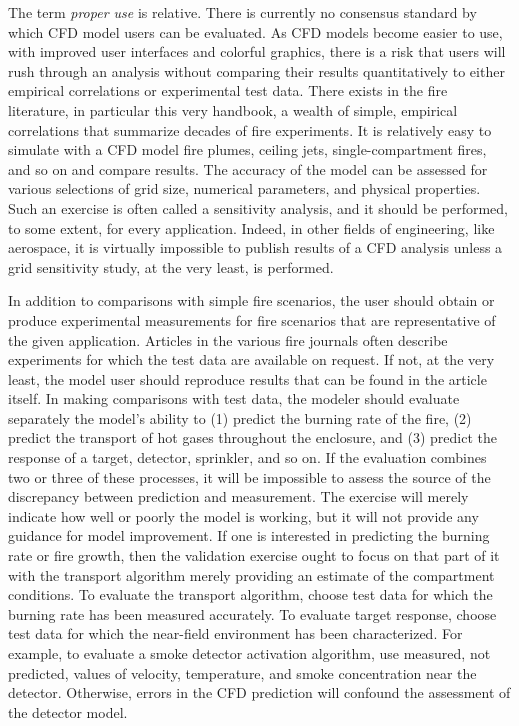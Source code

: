 \documentclass[graybox]{svmult}
\begin{document}
The term {\em proper use} is relative. There is currently no consensus standard by which CFD model users can be evaluated. As CFD models become easier to use, with improved user interfaces and colorful graphics, there is a risk that users will rush through an analysis without comparing their results quantitatively to either empirical correlations or experimental test data. There exists in the fire literature, in particular this very handbook, a wealth of simple, empirical correlations that summarize decades of fire experiments. It is relatively easy to simulate with a CFD model fire plumes, ceiling jets, single-compartment fires, and so on and compare results. The accuracy of the model can be assessed for various selections of grid size, numerical parameters, and physical properties. Such an exercise is often called a sensitivity analysis, and it should be performed, to some extent, for every application. Indeed, in other fields of engineering, like aerospace, it is virtually impossible to publish results of a CFD analysis unless a grid sensitivity study, at the very least, is performed.

In addition to comparisons with simple fire scenarios, the user should obtain or produce experimental measurements for fire scenarios that are representative of the given application. Articles in the various fire journals often describe experiments for which the test data are available on request. If not, at the very least, the model user should reproduce results that can be found in the article itself. In making comparisons with test data, the modeler should evaluate separately the model's ability to (1) predict the burning rate of the fire, (2) predict the transport of hot gases throughout the enclosure, and (3) predict the response of a target, detector, sprinkler, and so on. If the evaluation combines two or three of these processes, it will be impossible to assess the source of the discrepancy between prediction and measurement. The exercise will merely indicate how well or poorly the model is working, but it will not provide any guidance for model improvement. If one is interested in predicting the burning rate or fire growth, then the validation exercise ought to focus on that part of it with the transport algorithm merely providing an estimate of the compartment conditions. To evaluate the transport algorithm, choose test data for which the burning rate has been measured accurately. To evaluate target response, choose test data for which the near-field environment has been characterized. For example, to evaluate a smoke detector activation algorithm, use measured, not predicted, values of velocity, temperature, and smoke concentration near the detector. Otherwise, errors in the CFD prediction will confound the assessment of the detector model.
\end{document}
